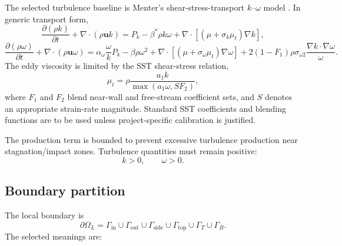 \documentclass[11pt,a4paper]{article}
\newcommand{\vect}[1]{\bm{#1}}
\newcommand{\grad}{\nabla}
\newcommand{\Div}{\nabla\!\cdot}
\begin{document}
The selected turbulence baseline is Menter's shear-stress-transport $k$--$\omega$ model \cite{menter1994}. In generic transport form,
\begin{equation}
  \frac{\partial(\rho k)}{\partial t}
  +\Div(\rho\vect u k)
  =P_k-\beta^*\rho k\omega
  +\Div\left[(\mu+\sigma_k\mu_t)\grad k\right],
  \label{eq:keq}
\end{equation}
\begin{equation}
  \frac{\partial(\rho\omega)}{\partial t}
  +\Div(\rho\vect u\omega)
  =\alpha_\omega\frac{\omega}{k}P_k
  -\beta\rho\omega^2
  +\Div\left[(\mu+\sigma_\omega\mu_t)\grad\omega\right]
  +2(1-F_1)\rho\sigma_{\omega2}
  \frac{\grad k\cdot\grad\omega}{\omega}.
  \label{eq:omegaeq}
\end{equation}
The eddy viscosity is limited by the SST shear-stress relation,
\begin{equation}
  \mu_t=\rho\frac{a_1k}{\max(a_1\omega,SF_2)},
  \label{eq:mut}
\end{equation}
where $F_1$ and $F_2$ blend near-wall and free-stream coefficient sets, and $S$ denotes an appropriate strain-rate magnitude. Standard SST coefficients and blending functions are to be used unless project-specific calibration is justified.

The production term is bounded to prevent excessive turbulence production near stagnation/impact zones. Turbulence quantities must remain positive:
\begin{equation}
  k>0,\qquad\omega>0.
\end{equation}

\subsection{Boundary partition}

The local boundary is
\begin{equation}
\partial\Omega_L=
\Gamma_{\mathrm{in}}\cup
\Gamma_{\mathrm{out}}\cup
\Gamma_{\mathrm{side}}\cup
\Gamma_{\mathrm{top}}\cup
\Gamma_T\cup
\Gamma_B.
\end{equation}
The selected meanings are:
\end{document}

